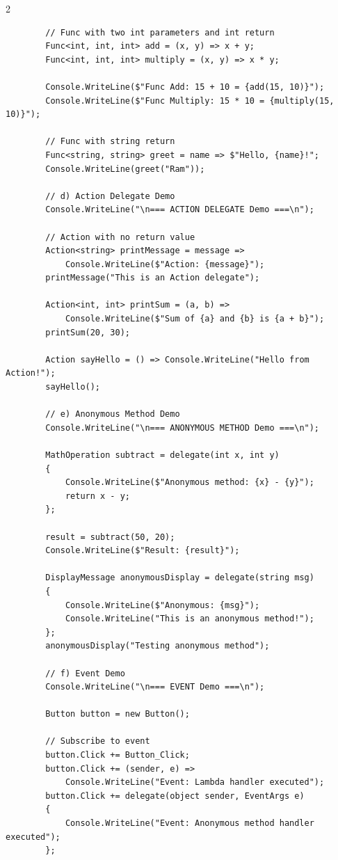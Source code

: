 \documentclass[10pt,a4paper]{article}
\begin{document}
\begin{multicols}{2}
\begin{lstlisting}
        // Func with two int parameters and int return
        Func<int, int, int> add = (x, y) => x + y;
        Func<int, int, int> multiply = (x, y) => x * y;
        
        Console.WriteLine($"Func Add: 15 + 10 = {add(15, 10)}");
        Console.WriteLine($"Func Multiply: 15 * 10 = {multiply(15, 10)}");
        
        // Func with string return
        Func<string, string> greet = name => $"Hello, {name}!";
        Console.WriteLine(greet("Ram"));
        
        // d) Action Delegate Demo
        Console.WriteLine("\n=== ACTION DELEGATE Demo ===\n");
        
        // Action with no return value
        Action<string> printMessage = message => 
            Console.WriteLine($"Action: {message}");
        printMessage("This is an Action delegate");
        
        Action<int, int> printSum = (a, b) => 
            Console.WriteLine($"Sum of {a} and {b} is {a + b}");
        printSum(20, 30);
        
        Action sayHello = () => Console.WriteLine("Hello from Action!");
        sayHello();
        
        // e) Anonymous Method Demo
        Console.WriteLine("\n=== ANONYMOUS METHOD Demo ===\n");
        
        MathOperation subtract = delegate(int x, int y)
        {
            Console.WriteLine($"Anonymous method: {x} - {y}");
            return x - y;
        };
        
        result = subtract(50, 20);
        Console.WriteLine($"Result: {result}");
        
        DisplayMessage anonymousDisplay = delegate(string msg)
        {
            Console.WriteLine($"Anonymous: {msg}");
            Console.WriteLine("This is an anonymous method!");
        };
        anonymousDisplay("Testing anonymous method");
        
        // f) Event Demo
        Console.WriteLine("\n=== EVENT Demo ===\n");
        
        Button button = new Button();
        
        // Subscribe to event
        button.Click += Button_Click;
        button.Click += (sender, e) => 
            Console.WriteLine("Event: Lambda handler executed");
        button.Click += delegate(object sender, EventArgs e)
        {
            Console.WriteLine("Event: Anonymous method handler executed");
        };
        

\end{lstlisting}
\end{multicols}
\end{document}
